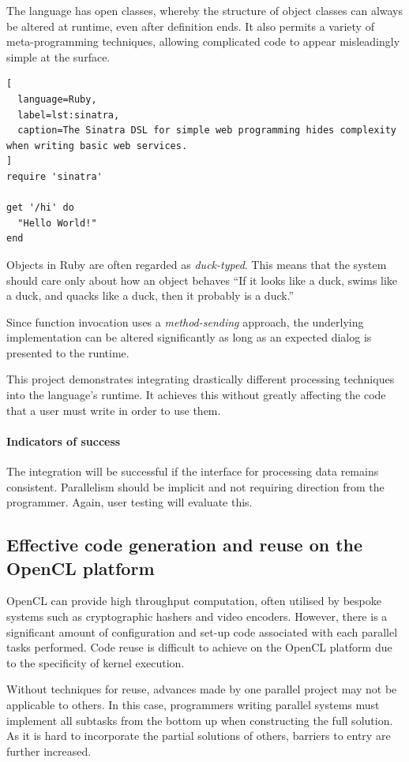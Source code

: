 The language has open classes, whereby the structure of object classes can always be altered at runtime, even after definition ends. It also permits a variety of meta-programming techniques, allowing complicated code to appear misleadingly simple at the surface.

\begin{lstlisting}[
  language=Ruby,
  label=lst:sinatra,
  caption=The Sinatra DSL for simple web programming hides complexity when writing basic web services.
]
require 'sinatra'

get '/hi' do
  "Hello World!"
end
\end{lstlisting}

Objects in Ruby are often regarded as \emph{duck-typed}. This means that the system should care only about how an object behaves \textemdash{} ``If it looks like a duck, swims like a duck, and quacks like a duck, then it probably is a duck.''\cite{ducktest}

Since function invocation uses a \emph{method-sending} approach, the underlying implementation can be altered significantly as long as an expected dialog is presented to the runtime.

This project demonstrates integrating drastically different processing techniques into the language's runtime. It achieves this without greatly affecting the code that a user must write in order to use them.

\paragraph*{Indicators of success}
The integration will be successful if the interface for processing data remains consistent. Parallelism should be implicit and not requiring direction from the programmer. Again, user testing will evaluate this.

\subsection{Effective code generation and reuse on the OpenCL platform}
\ac{OpenCL} can provide high throughput computation, often utilised by bespoke systems such as cryptographic hashers and video encoders. However, there is a significant amount of configuration and set-up code associated with each parallel tasks performed. Code reuse is difficult to achieve on the \ac{OpenCL} platform due to the specificity of kernel execution.

Without techniques for reuse, advances made by one parallel project may not be applicable to others. In this case, programmers writing parallel systems must implement all subtasks from the bottom up when constructing the full solution. As it is hard to incorporate the partial solutions of others, barriers to entry are further increased.

